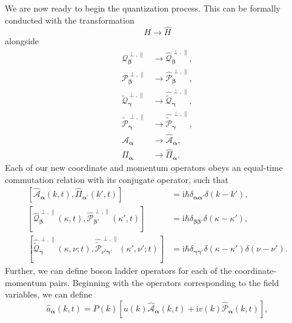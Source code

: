 \documentclass{article}
\begin{document}
We are now ready to begin the quantization process. This can be formally conducted with the transformation
\begin{equation}
H\to\hat{H}
\end{equation}
alongside
\begin{equation}
\begin{split}
\mathcal{Q}_{\bm{\beta}}^{\perp,\parallel}&\to\hat{\mathcal{Q}}_{\bm{\beta}}^{\perp,\parallel},\\
\mathcal{P}_{\bm{\beta}}^{\perp,\parallel}&\to\hat{\mathcal{P}}_{\bm{\beta}}^{\perp,\parallel},\\
\tilde{\mathcal{Q}}_{\bm{\gamma}}^{\perp,\parallel}&\to\hat{\tilde{\mathcal{Q}}}_{\bm{\gamma}}^{\perp,\parallel},\\
\tilde{\mathcal{P}}_{\bm{\gamma}}^{\perp,\parallel}&\to\hat{\tilde{\mathcal{P}}}_{\bm{\gamma}}^{\perp,\parallel},\\
\mathcal{A}_{\bm{\alpha}}&\to\hat{\mathcal{A}}_{\bm{\alpha}},\\
\mathit{\Pi}_{\bm{\alpha}}&\to\hat{\mathit{\Pi}}_{\bm{\alpha}}.
\end{split}
\end{equation}
Each of our new coordinate and momentum operators obeys an equal-time commutation relation with its conjugate operator, such that
\begin{equation}
\begin{split}
\left[\hat{\mathcal{A}}_{\bm{\alpha}}(k,t),\hat{\mathit{\Pi}}_{\bm{\alpha}'}(k',t)\right] &= \mathrm{i}\hbar\delta_{\bm{\alpha}\bm{\alpha}'}\delta(k - k'),\\
\left[\hat{\mathcal{Q}}_{\bm{\beta}}^{\perp,\parallel}(\kappa,t),\hat{\mathcal{P}}_{\bm{\beta}'}^{\perp,\parallel}(\kappa',t)\right] &= \mathrm{i}\hbar\delta_{\bm{\beta}\bm{\beta}'}\delta(\kappa - \kappa'),\\
\left[\hat{\tilde{\mathcal{Q}}}_{\bm{\gamma}}^{\perp,\parallel}(\kappa,\nu;t),\hat{\tilde{\mathcal{P}}}_{\nu'\bm{\gamma}'}^{\perp,\parallel}(\kappa',\nu';t)\right] &= \mathrm{i}\hbar\delta_{\bm{\gamma}\bm{\gamma}'}\delta(\kappa - \kappa')\delta(\nu - \nu').
\end{split}
\end{equation}
Further, we can define boson ladder operators for each of the coordinate-momentum pairs. Beginning with the operators corresponding to the field variables, we can define
\begin{equation}
\hat{a}_{\bm{\alpha}}(k,t) = P(k)\left[u(k)\hat{\mathcal{A}}_{\bm{\alpha}}(k,t) + \mathrm{i}v(k)\hat{\mathcal{P}}_{\bm{\alpha}}(k,t)\right],
\end{equation}
\end{document}
